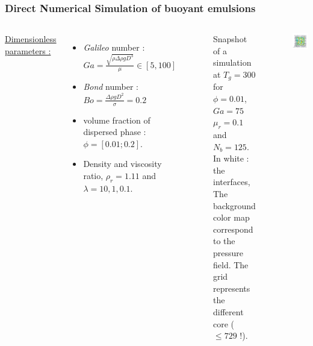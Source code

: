 \documentclass{sintefbeamer}
\begin{document}
\begin{frame}
  \frametitle{Direct Numerical Simulation of buoyant emulsions}
  \begin{columns}
  \underline{Dimensionless parameters :} 
  \begin{itemize}
    \item \textit{Galileo} number : $Ga =\frac{\sqrt{\rho \Delta\rho gD^3}}{\mu} \in [5, 100]$
    \item \textit{Bond} number : $Bo = \frac{\Delta \rho g D^2}{\sigma} = 0.2$ 
    \item volume fraction of dispersed phase : $\phi = [0.01;0.2]$. 
    \item Density and viscosity ratio, $\rho_r=1.11$ and $\lambda= 10,1,0.1$. 
  \end{itemize}
  
  \begin{figure}
    \caption{Snapshot of a simulation at $T_g = 300$ for $\phi = 0.01$, $Ga = 75$ $\mu_r = 0.1$ and $N_b = 125$. In white : the interfaces, The background color map correspond to the pressure field. The grid represents the different core ($\le 729$ !).
    }
  \end{figure}
  \centering
  \href{file:///work/fintzin/BUBLLES_PROJECT/movies/layers.mp4}{}
  \includegraphics[width =  1.1\textwidth]{image/PHI_01_Ga_75.png}
  \end{columns}
\end{frame}
\end{document}
